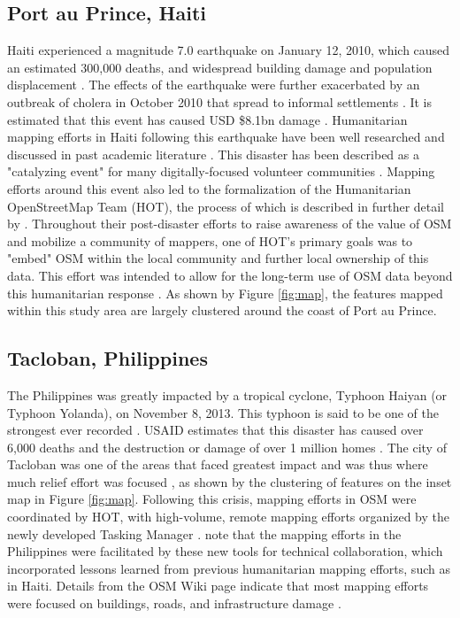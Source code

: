 \subsection{Port au Prince, Haiti}

Haiti experienced a magnitude 7.0 earthquake on January 12, 2010, which caused an estimated 300,000 deaths, and widespread building damage and population displacement \parencite{desroches_overview_2011}. The effects of the earthquake were further exacerbated by an outbreak of cholera in October 2010 that spread to informal settlements \parencite{noauthor_world_2011}. It is estimated that this event has caused USD \$8.1bn damage \parencite{cavallo_estimating_2010}. Humanitarian mapping efforts in Haiti following this earthquake have been well researched and discussed in past academic literature \parencite{zook_volunteered_2010, soden_crowdsourced_2014, palen_success_2015, meier_crisis_2012}. This disaster has been described as a "catalyzing event" for many digitally-focused volunteer communities \parencite[p. 314]{soden_crowdsourced_2014}. Mapping efforts around this event also led to the formalization of the Humanitarian OpenStreetMap Team (HOT), the process of which is described in further detail by \textcite{soden_crowdsourced_2014}. Throughout their post-disaster efforts to raise awareness of the value of OSM and mobilize a community of mappers, one of HOT's primary goals was to "embed" OSM within the local community and further local ownership of this data. This effort was intended to allow for the long-term use of OSM data beyond this humanitarian response \parencite{soden_crowdsourced_2014}. As shown by Figure \ref{fig:map}, the features mapped within this study area are largely clustered around the coast of Port au Prince. 

\subsection{Tacloban, Philippines}

The Philippines was greatly impacted by a tropical cyclone, Typhoon Haiyan (or Typhoon Yolanda), on November 8, 2013. This typhoon is said to be one of the strongest ever recorded \parencite{lum_typhoon_2014}. USAID estimates that this disaster has caused over 6,000 deaths and the destruction or damage of over 1 million homes \parencite{noauthor_typhoon_2014}. The city of Tacloban was one of the areas that faced greatest impact and was thus where much relief effort was focused \parencite{lum_typhoon_2014}, as shown by the clustering of features on the inset map in Figure \ref{fig:map}. Following this crisis, mapping efforts in OSM were coordinated by HOT, with high-volume, remote mapping efforts organized by the newly developed Tasking Manager \parencite{noauthor_wikiproject_2018}. \textcite{palen_success_2015} note that the mapping efforts in the Philippines were facilitated by these new tools for technical collaboration, which incorporated lessons learned from previous humanitarian mapping efforts, such as in Haiti. Details from the OSM Wiki page indicate that most mapping efforts were focused on buildings, roads, and infrastructure damage \parencite{noauthor_wikiproject_2018}.

